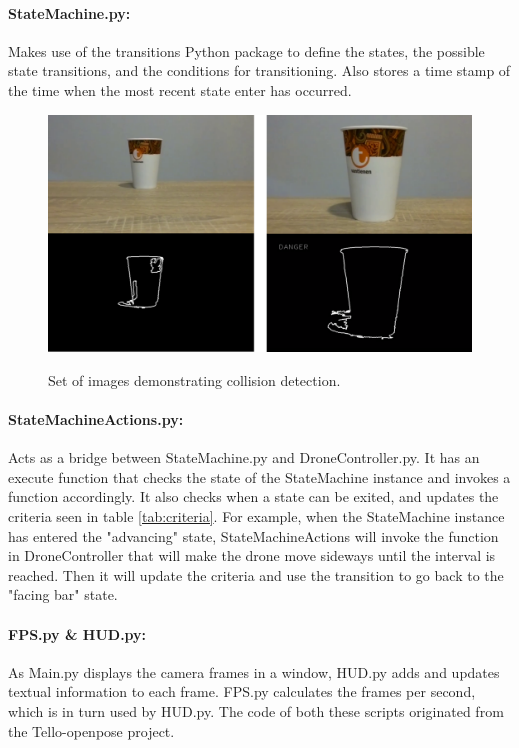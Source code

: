 \paragraph{StateMachine.py:} Makes use of the transitions Python package to define the states, the possible state transitions, and the conditions for transitioning. Also stores a time stamp of the time when the most recent state enter has occurred.
\begin{figure}[h]
	\centering
	\includegraphics[width=\linewidth]{img/collision_detection_sample}
	\label{fig:collision_detection}
	\caption{Set of images demonstrating collision detection.}
\end{figure}

\paragraph{StateMachineActions.py:} Acts as a bridge between StateMachine.py and DroneController.py. It has an execute function that checks the state of the StateMachine instance and invokes a function accordingly. It also checks when a state can be exited, and updates the criteria seen in table \ref{tab:criteria}. For example, when the StateMachine instance has entered the "advancing" state, StateMachineActions will invoke the function in DroneController that will make the drone move sideways until the interval is reached. Then it will update the criteria and use the transition to go back to the "facing bar" state.

\paragraph{FPS.py \& HUD.py:} As Main.py displays the camera frames in a window, HUD.py adds and updates textual information to each frame. FPS.py calculates the frames per second, which is in turn used by HUD.py. The code of both these scripts originated from the Tello-openpose project.
\pagebreak
